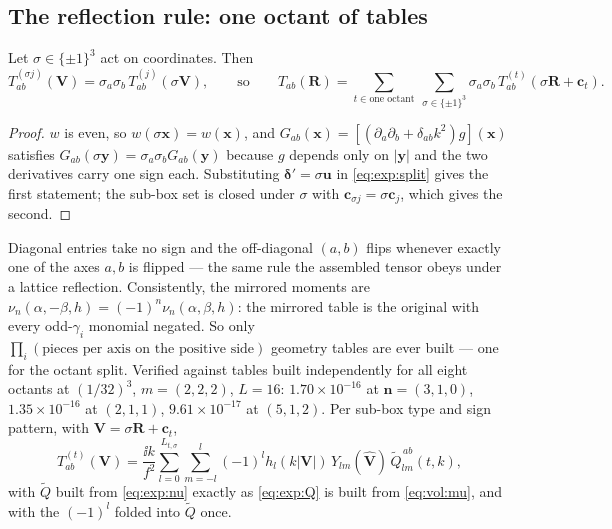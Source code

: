 \subsection{The reflection rule: one octant of tables}
\label{sec:exp:refl}

\begin{proposition}[reflection]
\label{prop:exp:refl}
Let $\sigma \in \{\pm1\}^3$ act on coordinates. Then
\begin{equation}
T^{(\sigma j)}_{ab}(\mathbf{V}) = \sigma_a\sigma_b\,T^{(j)}_{ab}(\sigma\mathbf{V}),
\qquad\text{so}\qquad
T_{ab}(\mathbf{R}) = \sum_{t \in \text{one octant}}\ \sum_{\sigma\in\{\pm1\}^3}
\sigma_a\sigma_b\,T^{(t)}_{ab}(\sigma\mathbf{R}+\mathbf{c}_t).
\label{eq:exp:refl}
\end{equation}
\end{proposition}

\begin{proof}
$w$ is even, so $w(\sigma\mathbf{x}) = w(\mathbf{x})$, and
$G_{ab}(\mathbf{x}) = [(\partial_a\partial_b+\delta_{ab}k^2)g](\mathbf{x})$ satisfies
$G_{ab}(\sigma\mathbf{y}) = \sigma_a\sigma_b G_{ab}(\mathbf{y})$ because $g$ depends only
on $|\mathbf{y}|$ and the two derivatives carry one sign each. Substituting
$\boldsymbol{\delta}' = \sigma\mathbf{u}$ in \eqref{eq:exp:split} gives the first
statement; the sub-box set is closed under $\sigma$ with
$\mathbf{c}_{\sigma j} = \sigma\mathbf{c}_j$, which gives the second.
\end{proof}

Diagonal entries take no sign and the off-diagonal $(a,b)$ flips whenever exactly one of
the axes $a,b$ is flipped --- the same rule the assembled tensor obeys under a lattice
reflection. Consistently, the mirrored moments are
$\nu_n(\alpha,-\beta,h) = (-1)^n\nu_n(\alpha,\beta,h)$: the mirrored table is the original
with every odd-$\gamma_i$ monomial negated. So only
$\prod_i(\text{pieces per axis on the positive side})$ geometry tables are ever built ---
one for the octant split. Verified against tables built independently for all eight
octants at $(1/32)^3$, $m = (2,2,2)$, $L = 16$: $1.70\times10^{-16}$ at
$\mathbf{n} = (3,1,0)$, $1.35\times10^{-16}$ at $(2,1,1)$, $9.61\times10^{-17}$ at
$(5,1,2)$. Per sub-box type and sign pattern, with $\mathbf{V} = \sigma\mathbf{R} +
\mathbf{c}_t$,
\begin{equation}
T^{(t)}_{ab}(\mathbf{V}) = \frac{\ii k}{f^2}\sum_{l=0}^{L_{t,\sigma}}\sum_{m=-l}^{l}
(-1)^l h_l(k|\mathbf{V}|)\,Y_{lm}(\hat{\mathbf{V}})\,\widetilde{Q}^{\,ab}_{lm}(t,k),
\label{eq:exp:subeval}
\end{equation}
with $\widetilde{Q}$ built from \eqref{eq:exp:nu} exactly as \eqref{eq:exp:Q} is built
from \eqref{eq:vol:mu}, and with the $(-1)^l$ folded into $\widetilde{Q}$ once.

